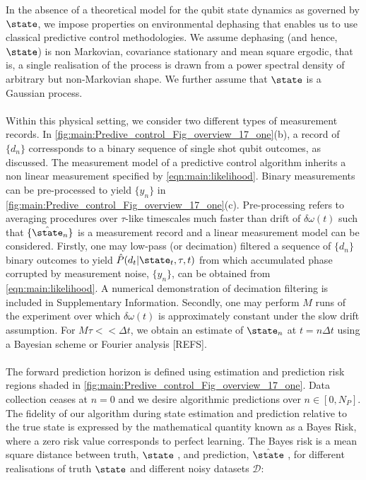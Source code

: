 In the absence of a theoretical model for the qubit state dynamics as governed by $\state$, we impose properties on environmental dephasing that enables us to use classical predictive control methodologies. We assume dephasing (and hence, $\state$) is non Markovian, covariance stationary and mean square ergodic, that is, a single realisation of the process is drawn from a power spectral density of arbitrary but non-Markovian shape. We further assume that $\state$  is a Gaussian process.
\\
\\
Within this physical setting, we consider two different types of measurement records. In \cref{fig:main:Predive_control_Fig_overview_17_one}(b), a record of $\{ d_n\}$  corressponds to a binary sequence of single shot qubit outcomes, as discussed. The measurement model of a predictive control algorithm inherits a non linear measurement specified by \cref{eqn:main:likelihood}. Binary measurements can be pre-processed to yield $\{ y_n\}$ in \cref{fig:main:Predive_control_Fig_overview_17_one}(c). Pre-processing refers to averaging procedures over $\tau$-like timescales much faster than drift of $\delta \omega (t)$ such that $\{ \hat{\state}_n\}$ is a measurement record and a linear measurement model can be considered. Firstly, one may low-pass (or decimation) filtered a sequence of $\{ d_n\}$ binary outcomes to yield $\hat{P}(d_t | \state_t, \tau, t)$ from which accumulated phase corrupted by measurement noise, $\{ y_n\}$, can be obtained from \cref{eqn:main:likelihood}. A numerical demonstration of decimation filtering is included in Supplementary Information. Secondly, one may perform $M$ runs of the experiment over which $\delta \omega (t)$ is approximately constant under the slow drift assumption. For $M\tau << \Delta t$, we obtain an estimate of  $\state_n$ at $t = n \Delta t $ using a Bayesian scheme or Fourier analysis [REFS]. 
\\
\\
The forward prediction horizon is defined using estimation and prediction risk regions shaded in \cref{fig:main:Predive_control_Fig_overview_17_one}. Data collection ceases at $n=0$  and we desire algorithmic predictions over $ n \in [0, N_P]$. The fidelity of our algorithm during state estimation and prediction relative to the true state is expressed by the mathematical quantity known as a Bayes Risk, where a zero risk value corresponds to perfect learning. The Bayes risk is a mean square distance between truth, $\state$ , and prediction, $\hat{\state}$ , for different realisations of truth $\state$ and different noisy datasets $\mathcal{D}$:
